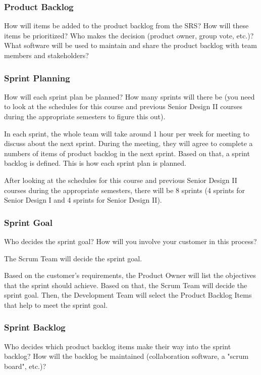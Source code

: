 \subsubsection{Product Backlog}
How will items be added to the product backlog from the SRS? How will these items be prioritized? Who makes the decision (product owner, group vote, etc.)? What software will be used to maintain and share the product backlog with team members and stakeholders?

\subsubsection{Sprint Planning}
How will each sprint plan be planned? How many sprints will there be (you need to look at the schedules for this course and previous Senior Design II courses during the appropriate semesters to figure this out).

In each sprint, the whole team will take around 1 hour per week for meeting to discuss about the next sprint. During the meeting, they will agree to complete a numbers of items of product backlog in the next sprint. Based on that, a sprint backlog is defined. This is how each sprint plan is planned. 

After looking at the schedules for this course and previous Senior Design II courses during the appropriate semesters, there will be 8 sprints (4 sprints for Senior Design I and 4 sprints for Senior Design II).

\subsubsection{Sprint Goal}
Who decides the sprint goal? How will you involve your customer in this process?

The Scrum Team will decide the sprint goal.

Based on the customer's requirements, the Product Owner will list the objectives that the sprint should achieve. Based on that, the Scrum Team will decide the sprint goal. Then, the Development Team will select the Product Backlog Items that help to meet the sprint goal. 

\subsubsection{Sprint Backlog}
Who decides which product backlog items make their way into the sprint backlog? How will the backlog be maintained (collaboration software, a "scrum board", etc.)?

